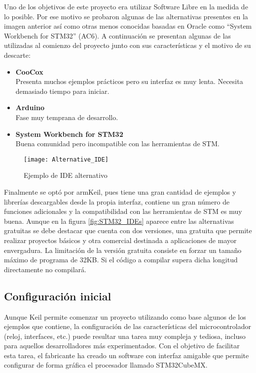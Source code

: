 Uno de los objetivos de este proyecto era utilizar Software Libre en la medida de lo posible. Por ese motivo se probaron algunas de las alternativas presentes en la imagen anterior así como otras menos conocidas basadas en Oracle como ``System Workbench for STM32'' (AC6). A continuación se presentan algunas de las utilizadas al comienzo del proyecto junto con sus características y el motivo de su descarte:
\begin{itemize}
   \item \textbf{CooCox}\\
   Presenta muchos ejemplos prácticos pero su interfaz es muy lenta. Necesita demasiado tiempo para iniciar.
   \item \textbf{Arduino}\\
   Fase muy temprana de desarrollo.
   \item \textbf{System Workbench for STM32}
   \\Buena comunidad pero incompatible con las herramientas de STM.
\end{itemize}

\begin{figure} [h]
    \centering
    \texttt{[image: Alternative\_IDE]}
    \caption{Ejemplo de IDE alternativo}
    \label{fig:Alternative_IDE}
\end{figure}

Finalmente se optó por armKeil, pues tiene una gran cantidad de ejemplos y librerías descargables desde la propia interfaz, contiene un gran número de funciones adicionales y la compatibilidad con las herramientas de STM es muy buena. Aunque en la figura \ref{fig:STM32_IDEs} aparece entre las alternativas gratuitas se debe destacar que cuenta con dos versiones, una gratuita que permite realizar proyectos básicos y otra comercial destinada a aplicaciones de mayor envergadura. La limitación de la versión gratuita consiste en forzar un tamaño máximo de programa de 32KB. Si el código a compilar supera dicha longitud directamente no compilará.

\subsection{Configuración inicial\label{Configuracion_micro}}

Aunque Keil permite comenzar un proyecto utilizando como base algunos de los ejemplos que contiene, la configuración de las características del microcontrolador (reloj, interfaces, etc.) puede resultar una tarea muy compleja y tediosa, incluso para aquellos desarrolladores más experimentados. Con el objetivo de facilitar esta tarea, el fabricante ha creado un software con interfaz amigable que permite configurar de forma gráfica el procesador llamado STM32CubeMX.

